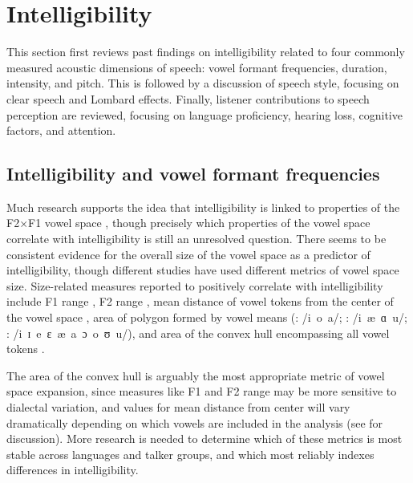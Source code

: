 
\section{Intelligibility}
This section first reviews past findings on intelligibility related to four commonly measured acoustic dimensions of speech: vowel formant frequencies, duration, intensity, and pitch.  %
This is followed by a discussion of speech style, focusing on clear speech and Lombard effects.  Finally, listener contributions to speech perception are reviewed, focusing on language proficiency, hearing loss, cognitive factors, and attention.

\subsection{Intelligibility and vowel formant frequencies\label{sec:IntelVowel}}
Much research supports the idea that intelligibility is linked to properties of the F2×F1 vowel space \citep[\eg][]{BondMoore1994, BradlowEtAl1996, HazanMarkham2004, Neel2008, McCloyEtAl2013}, though precisely which properties of the vowel space correlate with intelligibility is still an unresolved question.  There seems to be consistent evidence for the overall size of the vowel space as a predictor of intelligibility, though different studies have used different metrics of vowel space size.  Size-related measures reported to positively correlate with intelligibility include F1 range \citep{BradlowEtAl1996}, F2 range \citep{HazanMarkham2004}, mean distance of vowel tokens from the center of the vowel space \citep{BradlowEtAl1996, McCloyEtAl2013}, area of polygon formed by vowel means (\citealt{BradlowEtAl1996}: /i~o~a/; \citealt{Neel2008}: /i~æ~ɑ~u/;  \citealt{McCloyEtAl2012}: /i~ɪ~e~ɛ~æ~a~ɔ~o~ʊ~u/), and area of the convex hull encompassing all vowel tokens \citep{McCloyEtAl2013}.  

The area of the convex hull is arguably the most appropriate metric of vowel space expansion, since measures like F1 and F2 range may be more sensitive to dialectal variation, and values for mean distance from center will vary dramatically depending on which vowels are included in the analysis (see \citealt{McCloyEtAl2013} for discussion).  More research is needed to determine which of these metrics is most stable across languages and talker groups, and which most reliably indexes differences in intelligibility.

